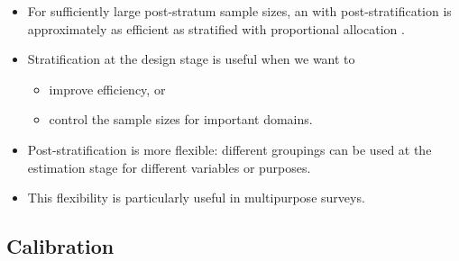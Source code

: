 \documentclass{my_eth_beamer}
\numberwithin{equation}{section}
\begin{document}
\begin{frame}
    \begin{itemize}
    \setlength{\itemsep}{12pt}
        \item For sufficiently large post-stratum sample sizes, an \SRS with
            post-stratification is approximately as \alert{efficient} as
            stratified \SRS with \alert{proportional allocation}
            \citep{holt_smith_1979}.
        \item Stratification at the design stage is useful when we want to
            \vspace{0.25em}
            \begin{itemize}
            \setlength{\itemsep}{4pt}
                \item improve \alert{efficiency}, or
                \item control the sample sizes for important
                    \alert{domains}.
            \end{itemize}
        \item Post-stratification is more \alert{flexible}: different
            groupings can be used at the estimation stage for different
            variables or purposes.
        \item This flexibility is particularly useful in
            \alert{multipurpose surveys}.
    \end{itemize}
\end{frame}

\subsection{Calibration}
\end{document}
